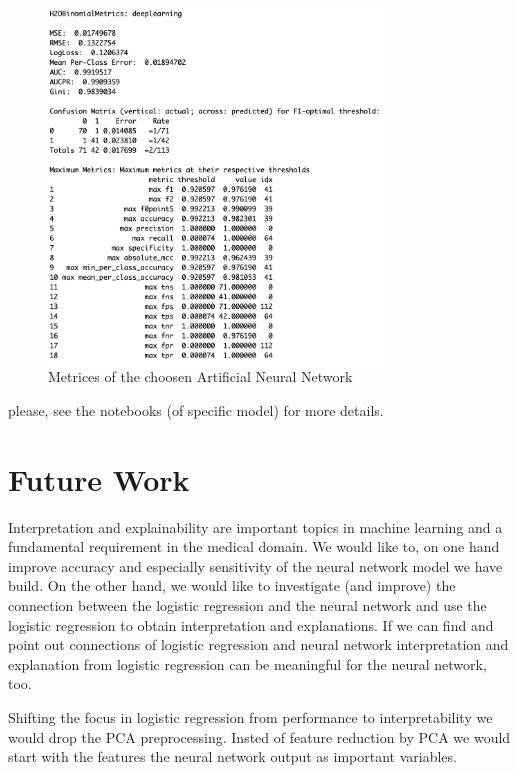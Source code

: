 \documentclass[]{article}
\begin{document}
\begin{figure}
    \centering
    \includegraphics[width=0.8\textwidth]{images/h2o_model_performance.png}
    \caption{Metrices of the choosen Artificial Neural Network}
    \label{fig:h2o_model_performance}
\end{figure}

please, see the notebooks (of specific model) for more details.

\section{Future Work}\label{future-work}

Interpretation and explainability are important topics in machine
learning and a fundamental requirement in the medical domain. We would
like to, on one hand improve accuracy and especially sensitivity of the
neural network model we have build. On the other hand, we would like to
investigate (and improve) the connection between the logistic regression
and the neural network and use the logistic regression to obtain
interpretation and explanations. If we can find and point out
connections of logistic regression and neural network interpretation and
explanation from logistic regression can be meaningful for the neural
network, too.

Shifting the focus in logistic regression from performance to
interpretability we would drop the PCA preprocessing. Insted of feature
reduction by PCA we would start with the features the neural network
output as important variables.
\end{document}
